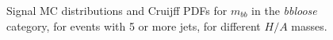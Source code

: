 \begin{figure}[phtb!]
\begin{center}
  \caption{Signal MC distributions and Cruijff PDFs for $m_{bb}$ in the {\it bbloose} category, for events with 5 or more jets, for different $H/A$ masses. \label{fig:signalPDFs_5j_bbloose}}
    \end{center}
\end{figure}

